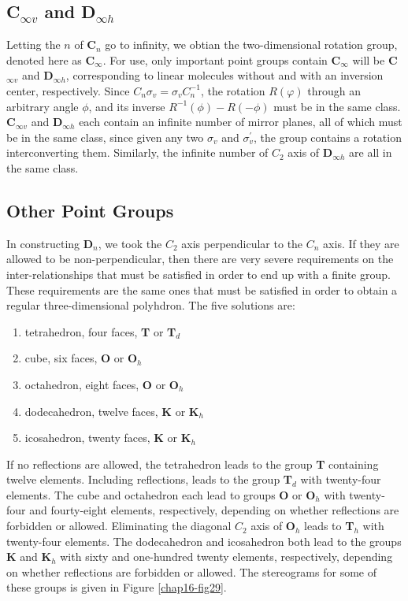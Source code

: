 \begin{figure}
\caption{}
\label{chap16-fig28}
\end{figure}


\subsection{C$_{\infty v}$ and D$_{\infty h}$}

Letting the $n$ of {\bf C}$_n$ go to infinity, we obtian the 
two-dimensional rotation group, denoted here as {\bf C}$_{\infty}$.  
For use, only important point groups contain {\bf C}$_{\infty}$ will 
be {\bf C}$_{\infty v}$ and {\bf D}$_{\infty h}$, corresponding to 
linear molecules without and with an inversion center, respectively.  
Since $C_n \sigma_v = \sigma_v C_n^{-1}$, the rotation $R(\varphi)$ 
through an arbitrary angle $\phi$, and its inverse 
$R^{-1}(\phi)-R(-\phi)$ must be in the same class.  {\bf C}$_{\infty v}$ 
and {\bf D}$_{\infty h}$ each contain an infinite number of mirror 
planes, all of which must be in the same class, since given any two 
$\sigma_v$ and $\sigma^{\prime}_v$, the group contains a rotation 
interconverting them. Similarly, the infinite number of $C_2$ axis of 
{\bf D}$_{\infty h}$ are all in the same class.

\subsection{Other Point Groups}

In constructing {\bf D}$_n$, we took the $C_2$ axis perpendicular to 
the $C_n$ axis.  If they are allowed to be non-perpendicular, then 
there are very severe requirements on the inter-relationships that 
must be satisfied in order to end up with a finite group.  These 
requirements are the same ones that must be satisfied in order to 
obtain a regular three-dimensional polyhdron.  The five solutions are:
\begin{enumerate}
\item tetrahedron, four faces, {\bf T} or {\bf T}$_d$
\item cube, six faces, {\bf O} or {\bf O}$_h$
\item octahedron, eight faces, {\bf O} or {\bf O}$_h$
\item dodecahedron, twelve faces, {\bf K} or {\bf K}$_h$
\item icosahedron, twenty faces, {\bf K} or {\bf K}$_h$
\end{enumerate}
If no reflections are allowed, the tetrahedron leads to the group {\bf
T} containing twelve elements.  Including reflections, leads to the
group {\bf T}$_d$ with twenty-four elements.  The cube and octahedron
each lead to groups {\bf O} or {\bf O}$_h$ with twenty-four and
fourty-eight elements, respectively, depending on whether reflections
are forbidden or allowed.  Eliminating the diagonal $C_2$ axis of {\bf
O}$_h$ leads to {\bf T}$_h$ with twenty-four elements.  The
dodecahedron and icosahedron both lead to the groups {\bf K} and {\bf
K}$_h$ with sixty and one-hundred twenty elements, respectively,
depending on whether reflections are forbidden or allowed.  The
stereograms for some of these groups is given in Figure
\ref{chap16-fig29}.

